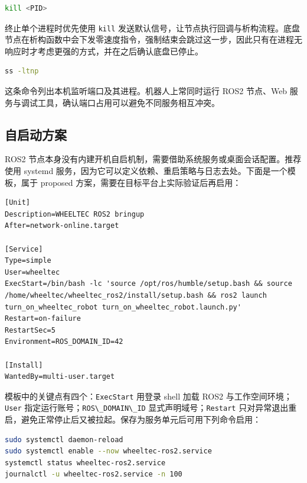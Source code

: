 \begin{lstlisting}[language=bash]
kill <PID>
\end{lstlisting}

终止单个进程时优先使用 \passthrough{\lstinline!kill!}
发送默认信号，让节点执行回调与析构流程。底盘节点在析构函数中会下发零速度指令，强制结束会跳过这一步，因此只有在进程无响应时才考虑更强的方式，并在之后确认底盘已停止。

\begin{lstlisting}[language=bash]
ss -ltnp
\end{lstlisting}

这条命令列出本机监听端口及其进程。机器人上常同时运行 ROS2 节点、Web
服务与调试工具，确认端口占用可以避免不同服务相互冲突。

\subsection{自启动方案}\label{ux81eaux542fux52a8ux65b9ux6848}

ROS2
节点本身没有内建开机自启机制，需要借助系统服务或桌面会话配置。推荐使用
systemd
服务，因为它可以定义依赖、重启策略与日志去处。下面是一个模板，属于
proposed 方案，需要在目标平台上实际验证后再启用：

\begin{lstlisting}
[Unit]
Description=WHEELTEC ROS2 bringup
After=network-online.target

[Service]
Type=simple
User=wheeltec
ExecStart=/bin/bash -lc 'source /opt/ros/humble/setup.bash && source /home/wheeltec/wheeltec_ros2/install/setup.bash && ros2 launch turn_on_wheeltec_robot turn_on_wheeltec_robot.launch.py'
Restart=on-failure
RestartSec=5
Environment=ROS_DOMAIN_ID=42

[Install]
WantedBy=multi-user.target
\end{lstlisting}

模板中的关键点有四个：\passthrough{\lstinline!ExecStart!} 用登录 shell
加载 ROS2 与工作空间环境；\passthrough{\lstinline!User!}
指定运行账号；\passthrough{\lstinline!ROS\_DOMAIN\_ID!}
显式声明域号；\passthrough{\lstinline!Restart!}
只对异常退出重启，避免正常停止后又被拉起。保存为服务单元后可用下列命令启用：

\begin{lstlisting}[language=bash]
sudo systemctl daemon-reload
sudo systemctl enable --now wheeltec-ros2.service
systemctl status wheeltec-ros2.service
journalctl -u wheeltec-ros2.service -n 100
\end{lstlisting}

